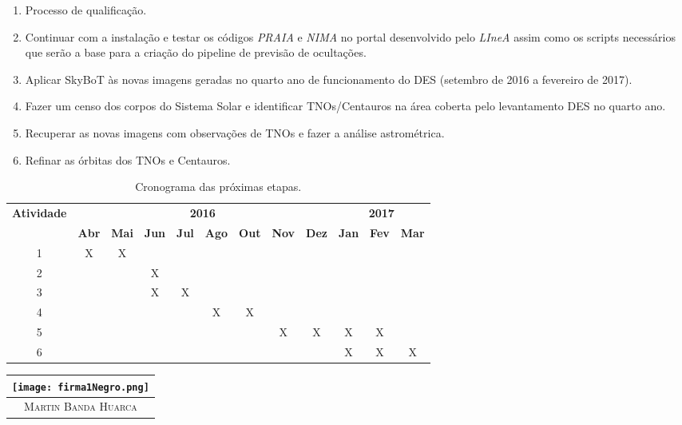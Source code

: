 \documentclass[a4paper, 11pt]{article}
\begin{document}
\begin{enumerate}
\item Processo de qualifica\c{c}\~ao.
\item Continuar com a instala\c{c}\~ao e testar os c\'odigos \textit{PRAIA} e \textit{NIMA} no portal desenvolvido pelo \textit{LIneA} assim como os scripts necess\'arios que ser\~ao a base para a cria\c{c}\~ao do pipeline de previs\~ao de oculta\c{c}\~oes.
\item Aplicar SkyBoT \`as novas imagens geradas no quarto ano de funcionamento do DES (setembro de 2016 a fevereiro de 2017).
\item Fazer um censo dos corpos do Sistema Solar e identificar TNOs/Centauros na \'area coberta pelo levantamento DES no quarto ano.
\item Recuperar as novas imagens com observa\c{c}\~oes de TNOs e fazer a an\'alise astrom\'etrica.
\item Refinar as \'orbitas dos TNOs e Centauros.
\end{enumerate}

\begin{table}[H]
\centering
\begin{tabular}{cccccccccccc}
\toprule \multirow{2}{*}{\textbf{Atividade}}& \multicolumn{8}{c}{\textbf{2016}} & \multicolumn{3}{c}{\textbf{2017}} \\ \cline{2-12}
  & \textbf{Abr} & \textbf{Mai} & \textbf{Jun} & \textbf{Jul} & \textbf{Ago} & \textbf{Out} & \textbf{Nov} & \textbf{Dez} & \textbf{Jan} & \textbf{Fev} & \textbf{Mar}\\ \midrule 
1 & X & X &   &   &   &   &   &   &   &   &   \\ 
2 &   &   & X &   &   &   &   &   &   &   &   \\
3 &   &   & X & X &   &   &   &   &   &   &   \\ 
4 &   &   &   &   & X & X &   &   &   &   &   \\
5 &   &   &   &   &   &   & X & X & X & X &   \\
6 &   &   &   &   &   &   &   &   & X & X & X \\ \bottomrule
\end{tabular}
\caption{Cronograma das pr\'oximas etapas.}
\label{tab:cronograma}
\end{table}
 
 \newpage
%

%
%
%
 

\vfill \hfill
\begin{tabular}{c}
\texttt{[image: firma1Negro.png]}
\\ \hline
\textsc{Martin Banda Huarca}
\end{tabular}
\end{document}
